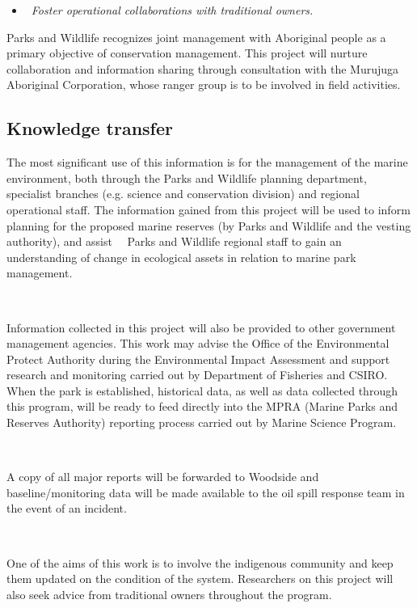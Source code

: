 \documentclass[version=last,
    paper=a4,                               %
    10pt,                                   %
    dvipsnames,
    oneside,                              %
    headings=openany,                       %
    open=any,
    BCOR=7mm,                               %
    DIV=15,     %
]{scrbook}
\providecommand{\tightlist}{\setlength{\itemsep}{0pt}\setlength{\parskip}{0pt}}
\begin{document}
\begin{itemize}
\tightlist
\item
  ~\emph{Foster operational collaborations with traditional owners.}
\end{itemize}

Parks and Wildlife recognizes joint management with Aboriginal people as
a primary objective of conservation management. This project will
nurture collaboration and information sharing through consultation with
the Murujuga Aboriginal Corporation, whose ranger group is to be
involved in field activities.




\subsection*{Knowledge transfer}

The most significant use of this information is for the management of
the marine environment, both through the Parks and Wildlife planning
department, specialist branches (e.g. science and conservation division)
and regional operational staff. The information gained from this project
will be used to inform planning for the proposed marine reserves (by
Parks and Wildlife and the vesting authority), and assist ~~Parks and
Wildlife regional staff to gain an understanding of change in ecological
assets in relation to marine park management.

~

Information collected in this project will also be provided to other
government management agencies. This work may advise the Office of the
Environmental Protect Authority during the Environmental Impact
Assessment and support research and monitoring carried out by Department
of Fisheries and CSIRO. When the park is established, historical data,
as well as data collected through this program, will be ready to feed
directly into the MPRA (Marine Parks and Reserves Authority) reporting
process carried out by Marine Science Program.

~

A copy of all major reports will be forwarded to Woodside and
baseline/monitoring data will be made available to the oil spill
response team in the event of an incident.

~

One of the aims of this work is to involve the indigenous community and
keep them updated on the condition of the system. Researchers on this
project will also seek advice from traditional owners throughout the
program.
\end{document}
